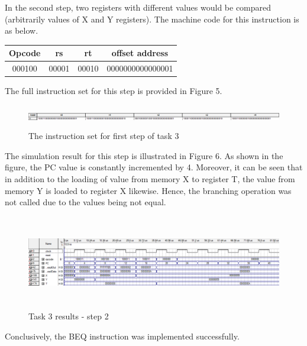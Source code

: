 \documentclass[12pt,a4paper]{article}
\begin{document}
	\noindent In the second step, two registers with different values would be compared (arbitrarily values of X and Y registers). The machine code for this instruction is as below. 
	
	\begin{table}[H]
		\centering
		\begin{tabular}{|c | c| c| c|}
			\hline
			\textbf{Opcode} & \textbf{rs} & \textbf{rt}& \textbf{offset address}\\ \hline
			000100& 00001 & 00010 & 0000000000000001\\\hline
		\end{tabular}
	\end{table}

	\noindent The full instruction set for this step is provided in Figure 5.
	
	\begin{figure}[H]
		\centering
		\includegraphics[height=1cm,width=14cm]{figures/code3.png}
		\caption{The instruction set for first step of task 3}
	\end{figure}

	\noindent The simulation result for this step is illustrated in Figure 6. As shown in the figure, the PC value is constantly incremented by 4. Moreover, it can be seen that in addition to the loading of value from memory X to register T, the value from memory Y is loaded to register X likewise. Hence, the branching operation was not called due to the values being not equal.
	
	\begin{figure}[H]
		\centering
		\includegraphics[height=4.1cm,width=15cm]{figures/simulations3.png}
		\caption{Task 3 results - step 2}
	\end{figure}

	\vspace{-0.2cm}
	\noindent Conclusively, the BEQ instruction was implemented successfully.
\end{document}
